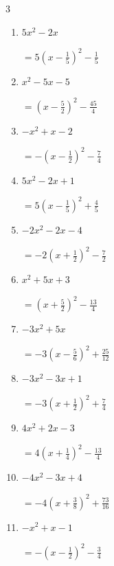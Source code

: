 \begin{multicols}{3}
\begin{enumerate}
        $\displaystyle =-4\left( x-\frac{1}{8}\right)^{2}-\frac{63}{16}$

  \item $5x^{2}-2x$

        $\displaystyle =5\left( x-\frac{1}{5}\right)^{2}-\frac{1}{5}$

\columnbreak %

\resetques

  \item $x^{2}-5x-5$

        $\displaystyle =\left( x-\frac{5}{2}\right)^{2}-\frac{45}{4}$

  \item $-x^{2}+x-2$

        $\displaystyle =-\left( x-\frac{1}{2}\right)^{2}-\frac{7}{4}$

  \item $5x^{2}-2x+1$

        $\displaystyle =5\left( x-\frac{1}{5}\right)^{2}+\frac{4}{5}$

  \item $-2x^{2}-2x-4$

        $\displaystyle =-2\left( x+\frac{1}{2}\right)^{2}-\frac{7}{2}$

  \item $x^{2}+5x+3$

        $\displaystyle =\left( x+\frac{5}{2}\right)^{2}-\frac{13}{4}$

\columnbreak %

  \item $-3x^{2}+5x$

        $\displaystyle =-3\left( x-\frac{5}{6}\right)^{2}+\frac{25}{12}$

  \item $-3x^{2}-3x+1$

        $\displaystyle =-3\left( x+\frac{1}{2}\right)^{2}+\frac{7}{4}$

  \item $4x^{2}+2x-3$

        $\displaystyle =4\left( x+\frac{1}{4}\right)^{2}-\frac{13}{4}$

  \item $-4x^{2}-3x+4$

        $\displaystyle =-4\left( x+\frac{3}{8}\right)^{2}+\frac{73}{16}$

  \item $-x^{2}+x-1$

        $\displaystyle =-\left( x-\frac{1}{2}\right)^{2}-\frac{3}{4}$


\end{enumerate}
\end{multicols}
